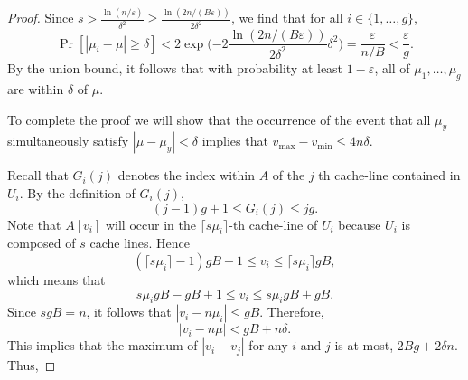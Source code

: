 \documentclass[a4paper,UKenglish,cleveref, autoref, thm-restate]{lipics-v2019}
\renewcommand{\epsilon}{\varepsilon}
\begin{document}
\begin{proof}
Since $s > \frac{\ln (n/\epsilon)}{\delta^2} \ge \frac{\ln (2n /
  (B\epsilon))}{2\delta^2}$, we find that for all $i \in
  \{1,\ldots, g\}$, $$\Pr[|\mu_i - \mu| \geq \delta] <
  2\exp\Big({-2} \frac{\ln (2n/(B\epsilon))}{2\delta^2}
  \delta^2\Big) = \frac{\epsilon}{n/B} < \frac{\epsilon}{g}. $$
  By the union bound, it follows that with probability at least
  $1 - \epsilon$, all of $\mu_1, \ldots, \mu_{g}$ are within
  $\delta$ of $\mu$.


To complete the proof we will show that the occurrence of the event
that all $\mu_y$ simultaneously satisfy $|\mu - \mu_y| < \delta$ implies
that $v_{\text{max}} - v_{\text{min}} \le 4n\delta$.



  Recall that $G_i(j)$ denotes the index within $A$ of the $j$ th
  cache-line contained in $U_i$. By the definition of $G_i(j)$,
  $$(j - 1)g + 1 \le G_i(j) \le jg.$$ Note that $A[v_i]$ will
  occur in the $\lceil s\mu_i \rceil$-th cache-line of $U_i$
  because $U_i$ is composed of $s$ cache lines. Hence $$(\lceil
  s\mu_i \rceil - 1) g B + 1 \le v_i \le \lceil s\mu_i \rceil g
  B,$$ which means that
  $$s\mu_i g B - gB + 1 \le v_i \le s\mu_i g B + gB.$$ Since $sgB = n$, 
  it follows that $|v_i - n \mu_i| \le gB$. Therefore,
  $$|v_i - n \mu| < gB + n\delta.$$
  This implies that the maximum of $|v_i - v_j|$ for
any $i$ and $j$ is at most, $2Bg + 2\delta n$. Thus,


\end{proof}
\end{document}
